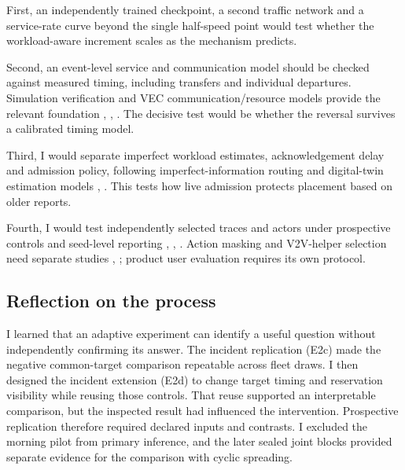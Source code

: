 \documentclass[12pt,a4paper]{article}
\begin{document}
First, an independently trained checkpoint, a second traffic network and a service-rate curve beyond the single half-speed point would test whether the workload-aware increment scales as the mechanism predicts.

Second, an event-level service and communication model should be checked against measured timing, including transfers and individual departures. Simulation verification and VEC communication/resource models provide the relevant foundation \cite{ref21}, \cite{ref31}, \cite{ref6}. The decisive test would be whether the reversal survives a calibrated timing model.

Third, I would separate imperfect workload estimates, acknowledgement delay and admission policy, following imperfect-information routing and digital-twin estimation models \cite{ref18}, \cite{ref30}. This tests how live admission protects placement based on older reports.

Fourth, I would test independently selected traces and actors under prospective controls and seed-level reporting \cite{ref25}, \cite{ref26}, \cite{ref39}. Action masking and V2V-helper selection need separate studies \cite{ref32}, \cite{ref40}; product user evaluation requires its own protocol.

\FloatBarrier
\subsection{Reflection on the process}\label{sec:4.5}

I learned that an adaptive experiment can identify a useful question without independently confirming its answer. The incident replication (E2c) made the negative common-target comparison repeatable across fleet draws. I then designed the incident extension (E2d) to change target timing and reservation visibility while reusing those controls. That reuse supported an interpretable comparison, but the inspected result had influenced the intervention. Prospective replication therefore required declared inputs and contrasts. I excluded the morning pilot from primary inference, and the later sealed joint blocks provided separate evidence for the comparison with cyclic spreading.
\end{document}
